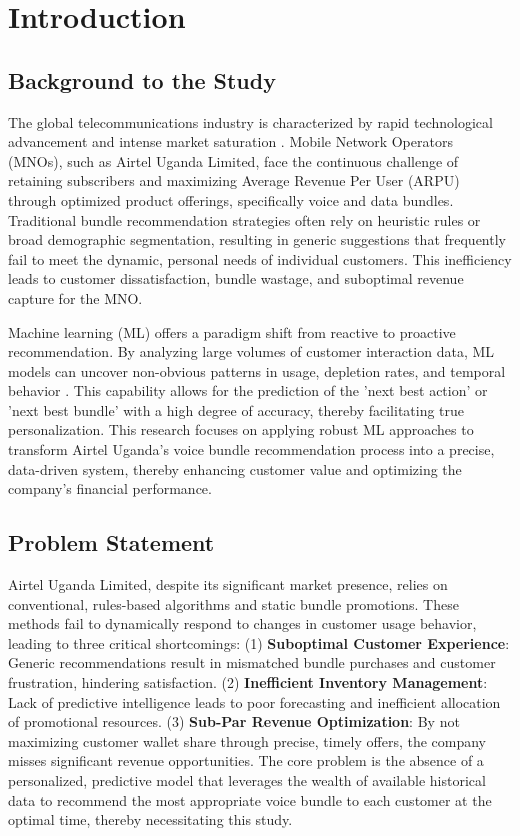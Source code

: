\documentclass[12pt, a4paper]{report}
\begin{document}
\chapter{Introduction}
\label{ch:intro}

\section{Background to the Study}
The global telecommunications industry is characterized by rapid technological advancement and intense market saturation \citep{sarwar2001itembased}. Mobile Network Operators (MNOs), such as Airtel Uganda Limited, face the continuous challenge of retaining subscribers and maximizing Average Revenue Per User (ARPU) through optimized product offerings, specifically voice and data bundles. Traditional bundle recommendation strategies often rely on heuristic rules or broad demographic segmentation, resulting in generic suggestions that frequently fail to meet the dynamic, personal needs of individual customers. This inefficiency leads to customer dissatisfaction, bundle wastage, and suboptimal revenue capture for the MNO.

Machine learning (ML) offers a paradigm shift from reactive to proactive recommendation. By analyzing large volumes of customer interaction data, ML models can uncover non-obvious patterns in usage, depletion rates, and temporal behavior \citep{shani2011evaluating}. This capability allows for the prediction of the 'next best action' or 'next best bundle' with a high degree of accuracy, thereby facilitating true personalization. This research focuses on applying robust ML approaches to transform Airtel Uganda's voice bundle recommendation process into a precise, data-driven system, thereby enhancing customer value and optimizing the company's financial performance.

\section{Problem Statement}
Airtel Uganda Limited, despite its significant market presence, relies on conventional, rules-based algorithms and static bundle promotions. These methods fail to dynamically respond to changes in customer usage behavior, leading to three critical shortcomings: (1) \textbf{Suboptimal Customer Experience}: Generic recommendations result in mismatched bundle purchases and customer frustration, hindering satisfaction. (2) \textbf{Inefficient Inventory Management}: Lack of predictive intelligence leads to poor forecasting and inefficient allocation of promotional resources. (3) \textbf{Sub-Par Revenue Optimization}: By not maximizing customer wallet share through precise, timely offers, the company misses significant revenue opportunities. The core problem is the absence of a personalized, predictive model that leverages the wealth of available historical data to recommend the most appropriate voice bundle to each customer at the optimal time, thereby necessitating this study.
\end{document}
